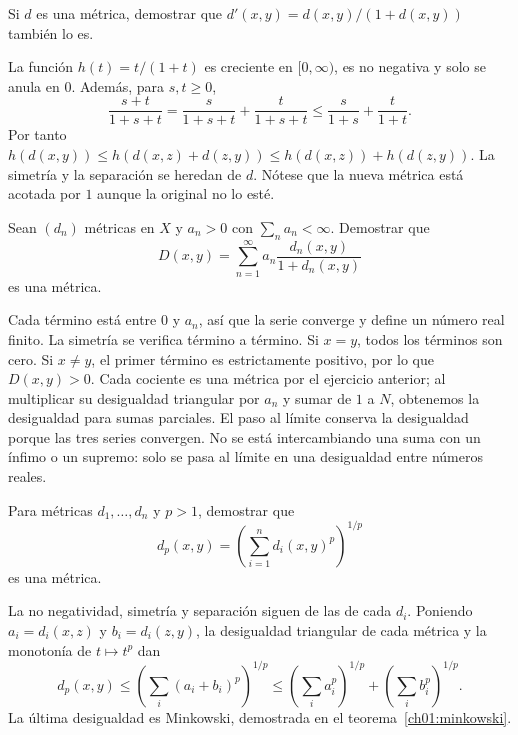 \begin{ejercicio}
Si $d$ es una métrica, demostrar que $d'(x,y)=d(x,y)/(1+d(x,y))$ también lo es.
\end{ejercicio}
\begin{solucion}
La función $h(t)=t/(1+t)$ es creciente en $[0,\infty)$, es no negativa y solo se anula en $0$. Además, para $s,t\ge0$,
\[
\frac{s+t}{1+s+t}=\frac{s}{1+s+t}+\frac{t}{1+s+t}
\le\frac{s}{1+s}+\frac{t}{1+t}.
\]
Por tanto $h(d(x,y))\le h(d(x,z)+d(z,y))\le h(d(x,z))+h(d(z,y))$. La simetría y la separación se heredan de $d$. Nótese que la nueva métrica está acotada por $1$ aunque la original no lo esté.
\end{solucion}

\begin{ejercicio}
Sean $(d_n)$ métricas en $X$ y $a_n>0$ con $\sum_na_n<\infty$. Demostrar que
\[
D(x,y)=\sum_{n=1}^{\infty}a_n\frac{d_n(x,y)}{1+d_n(x,y)}
\]
es una métrica.
\end{ejercicio}
\begin{solucion}
Cada término está entre $0$ y $a_n$, así que la serie converge y define un número real finito. La simetría se verifica término a término. Si $x=y$, todos los términos son cero. Si $x\ne y$, el primer término es estrictamente positivo, por lo que $D(x,y)>0$. Cada cociente es una métrica por el ejercicio anterior; al multiplicar su desigualdad triangular por $a_n$ y sumar de $1$ a $N$, obtenemos la desigualdad para sumas parciales. El paso al límite conserva la desigualdad porque las tres series convergen. No se está intercambiando una suma con un ínfimo o un supremo: solo se pasa al límite en una desigualdad entre números reales.
\end{solucion}

\begin{ejercicio}
Para métricas $d_1,\ldots,d_n$ y $p>1$, demostrar que
\[
d_p(x,y)=\left(\sum_{i=1}^n d_i(x,y)^p\right)^{1/p}
\]
es una métrica.
\end{ejercicio}
\begin{solucion}
La no negatividad, simetría y separación siguen de las de cada $d_i$. Poniendo $a_i=d_i(x,z)$ y $b_i=d_i(z,y)$, la desigualdad triangular de cada métrica y la monotonía de $t\mapsto t^p$ dan
\[
d_p(x,y)\le\left(\sum_i(a_i+b_i)^p\right)^{1/p}
\le\left(\sum_i a_i^p\right)^{1/p}+\left(\sum_i b_i^p\right)^{1/p}.
\]
La última desigualdad es Minkowski, demostrada en el teorema~\ref{ch01:minkowski}.
\end{solucion}

